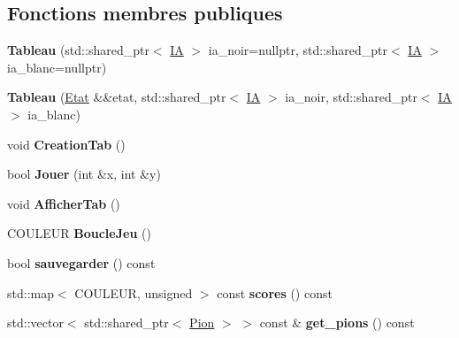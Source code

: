\subsection*{Fonctions membres publiques}
\begin{DoxyCompactItemize}
\item 
{\bfseries Tableau} (std\+::shared\+\_\+ptr$<$ \hyperlink{classIA}{IA} $>$ ia\+\_\+noir=nullptr, std\+::shared\+\_\+ptr$<$ \hyperlink{classIA}{IA} $>$ ia\+\_\+blanc=nullptr)\hypertarget{classTableau_a4b7923326eb0e5e2d1d2f8acf6445545}{}\label{classTableau_a4b7923326eb0e5e2d1d2f8acf6445545}

\item 
{\bfseries Tableau} (\hyperlink{structEtat}{Etat} \&\&etat, std\+::shared\+\_\+ptr$<$ \hyperlink{classIA}{IA} $>$ ia\+\_\+noir, std\+::shared\+\_\+ptr$<$ \hyperlink{classIA}{IA} $>$ ia\+\_\+blanc)\hypertarget{classTableau_adc95e4c3d822d09af273e29294313ac4}{}\label{classTableau_adc95e4c3d822d09af273e29294313ac4}

\item 
void {\bfseries Creation\+Tab} ()\hypertarget{classTableau_a8e8311ab52129da568acc092598b22c7}{}\label{classTableau_a8e8311ab52129da568acc092598b22c7}

\item 
bool {\bfseries Jouer} (int \&x, int \&y)\hypertarget{classTableau_a564072da82e057d02ad7edbee98e6e43}{}\label{classTableau_a564072da82e057d02ad7edbee98e6e43}

\item 
void {\bfseries Afficher\+Tab} ()\hypertarget{classTableau_a422f7b27c74ca34d81ef3446e0d88bb7}{}\label{classTableau_a422f7b27c74ca34d81ef3446e0d88bb7}

\item 
C\+O\+U\+L\+E\+UR {\bfseries Boucle\+Jeu} ()\hypertarget{classTableau_aae276afa0929c10f4c9a37c61a6166a9}{}\label{classTableau_aae276afa0929c10f4c9a37c61a6166a9}

\item 
bool {\bfseries sauvegarder} () const \hypertarget{classTableau_a7fe5d033577a970525067422053595ba}{}\label{classTableau_a7fe5d033577a970525067422053595ba}

\item 
std\+::map$<$ C\+O\+U\+L\+E\+UR, unsigned $>$ const {\bfseries scores} () const \hypertarget{classTableau_ac3c035ec5fcc5189b04392ff56d0441e}{}\label{classTableau_ac3c035ec5fcc5189b04392ff56d0441e}

\item 
std\+::vector$<$ std\+::shared\+\_\+ptr$<$ \hyperlink{structPion}{Pion} $>$ $>$ const \& {\bfseries get\+\_\+pions} () const \hypertarget{classTableau_a41e9e9c45b4dfea82cf2c4bb64fdf5a6}{}\label{classTableau_a41e9e9c45b4dfea82cf2c4bb64fdf5a6}

\end{DoxyCompactItemize}
